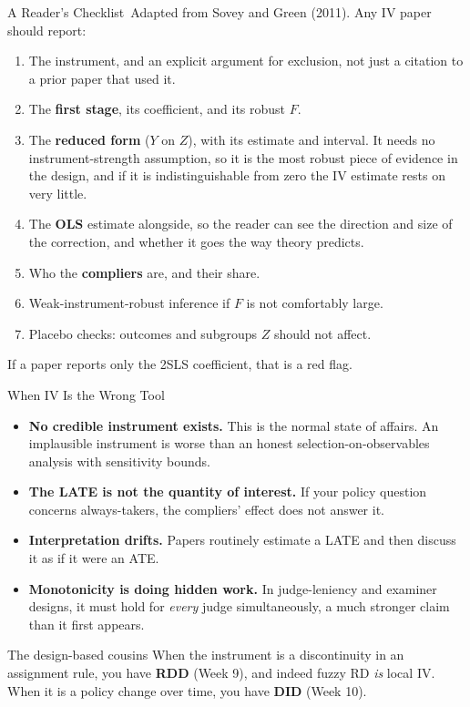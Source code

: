 \documentclass[aspectratio=169,11pt,xcolor=dvipsnames]{beamer}
\newcommand{\srct}[1]{#1}
\newcommand{\core}{\,\raisebox{0.6pt}{\textcolor{corestar}{$\bigstar$}}}
\begin{document}
\begin{frame}[allowframebreaks,t]{A Reader's Checklist\core}
Adapted from \srct{Sovey and Green (2011)}. Any IV paper should report:
\begin{enumerate}\itemsep2pt
  \item The instrument, and an explicit argument for exclusion, not just a
        citation to a prior paper that used it.
  \item The \textbf{first stage}, its coefficient, and its robust $F$.
  \item The \textbf{reduced form} ($Y$ on $Z$), with its estimate and interval.
        It needs no instrument-strength assumption, so it is the most robust piece
        of evidence in the design, and if it is indistinguishable from zero the
        IV estimate rests on very little.
  \item The \textbf{OLS} estimate alongside, so the reader can see the direction
        and size of the correction, and whether it goes the way theory predicts.
  \item Who the \textbf{compliers} are, and their share.
  \item Weak-instrument-robust inference if $F$ is not comfortably large.
  \item Placebo checks: outcomes and subgroups $Z$ should not affect.
\end{enumerate}
\vskip2pt
\alert{If a paper reports only the 2SLS coefficient, that is a red flag.}
\end{frame}

\begin{frame}[allowframebreaks,t]{When IV Is the Wrong Tool\core}
\begin{itemize}\itemsep3pt
  \item \textbf{No credible instrument exists.} This is the normal state of
        affairs. An implausible instrument is worse than an honest
        selection-on-observables analysis with sensitivity bounds.
  \item \textbf{The LATE is not the quantity of interest.} If your policy question
        concerns always-takers, the compliers' effect does not answer it.
  \item \textbf{Interpretation drifts.} Papers routinely estimate a LATE and then
        discuss it as if it were an ATE.
  \item \textbf{Monotonicity is doing hidden work.} In judge-leniency and
        examiner designs, it must hold for \emph{every} judge simultaneously, 
        a much stronger claim than it first appears.
\end{itemize}
\vskip3pt
\begin{block}{The design-based cousins}
When the instrument is a discontinuity in an assignment rule, you have
\textbf{RDD} (Week 9), and indeed fuzzy RD \emph{is} local IV. When it is a
policy change over time, you have \textbf{DID} (Week 10).
\end{block}
\end{frame}
\end{document}
